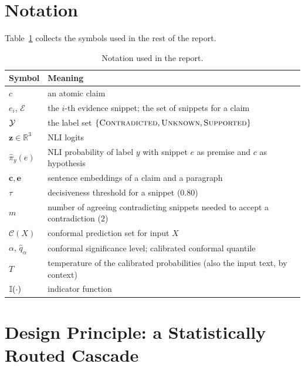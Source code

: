 \section{Notation}

Table~\ref{tab:notation} collects the symbols used in the rest of the report.

\begin{table}[H]
\centering
\caption{Notation used in the report.}
\label{tab:notation}
\small
\begin{tabular}{@{}ll@{}}
\toprule
Symbol & Meaning \\
\midrule
$c$ & an atomic claim \\
$e_i$, $\mathcal{E}$ & the $i$-th evidence snippet; the set of snippets for a claim \\
$\mathcal{Y}$ & the label set $\{\textsc{Contradicted}, \textsc{Unknown}, \textsc{Supported}\}$ \\
$\mathbf{z} \in \mathbb{R}^3$ & NLI logits \\
$\hat{\pi}_y(e)$ & NLI probability of label $y$ with snippet $e$ as premise and $c$ as hypothesis \\
$\mathbf{c}, \mathbf{e}$ & sentence embeddings of a claim and a paragraph \\
$\tau$ & decisiveness threshold for a snippet ($0.80$) \\
$m$ & number of agreeing contradicting snippets needed to accept a contradiction ($2$) \\
$\mathcal{C}(X)$ & conformal prediction set for input $X$ \\
$\alpha$, $\hat{q}_\alpha$ & conformal significance level; calibrated conformal quantile \\
$T$ & temperature of the calibrated probabilities (also the input text, by context) \\
$\mathbb{I}(\cdot)$ & indicator function \\
\bottomrule
\end{tabular}
\end{table}

\section{Design Principle: a Statistically Routed Cascade}

